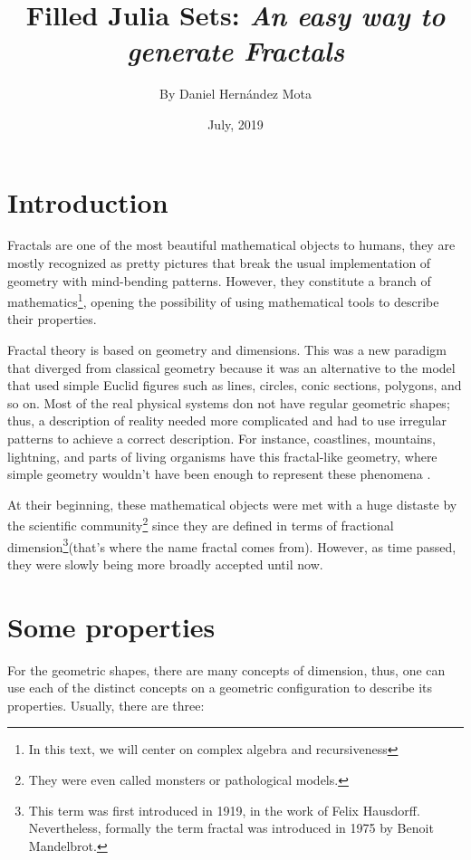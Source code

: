 \documentclass{article}
\title{Filled Julia Sets: \textit{An easy way to generate Fractals}}
\author{By Daniel Hernández Mota}
\date{July, 2019}
\begin{document}
\maketitle

\section{Introduction}

Fractals are one of the most beautiful mathematical objects to humans, they are mostly recognized as pretty pictures that break the usual implementation of geometry with mind-bending patterns. However, they constitute a branch of mathematics\footnote{In this text, we will center on complex algebra and recursiveness}, opening the possibility of using mathematical tools to describe their properties\cite{Edyta}. 

Fractal theory is based on geometry and dimensions. This was a new paradigm that diverged from classical geometry because it was an alternative to the model that used simple Euclid figures such as lines, circles, conic sections, polygons, and so on. Most of the real physical systems don not have regular geometric shapes; thus, a description of reality needed more complicated and had to use irregular patterns to achieve a correct description\cite{Crownover}. For instance, coastlines, mountains, lightning, and parts of living organisms have this fractal-like geometry, where simple geometry wouldn't have been enough to represent these phenomena \cite{Edyta}.

At their beginning, these mathematical objects were met with a huge distaste by the scientific community\footnote{They were even called monsters or pathological models.} since they are defined in terms of fractional dimension\footnote{This term was first introduced in 1919, in the work of Felix Hausdorff. Nevertheless, formally the term fractal was introduced in 1975 by Benoit Mandelbrot.}(that's where the name fractal comes from). However, as time passed, they were slowly being more broadly accepted until now. 
\newpage
\section{Some properties}
For the geometric shapes, there are many concepts of dimension, thus, one can use each of the distinct concepts on a geometric configuration to describe its properties. Usually, there are three\cite{Crownover}:
\end{document}
